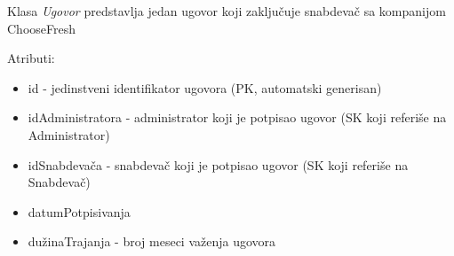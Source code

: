Klasa \textit{Ugovor} predstavlja jedan ugovor koji zaključuje snabdevač sa kompanijom ChooseFresh

Atributi:
\begin{itemize}
    \item id - jedinstveni identifikator ugovora (PK, automatski generisan)
    \item idAdministratora - administrator koji je potpisao ugovor (SK koji referiše na Administrator)
    \item idSnabdevača - snabdevač koji je potpisao ugovor (SK koji referiše na Snabdevač)
    \item datumPotpisivanja
    \item dužinaTrajanja - broj meseci važenja ugovora
\end{itemize}
